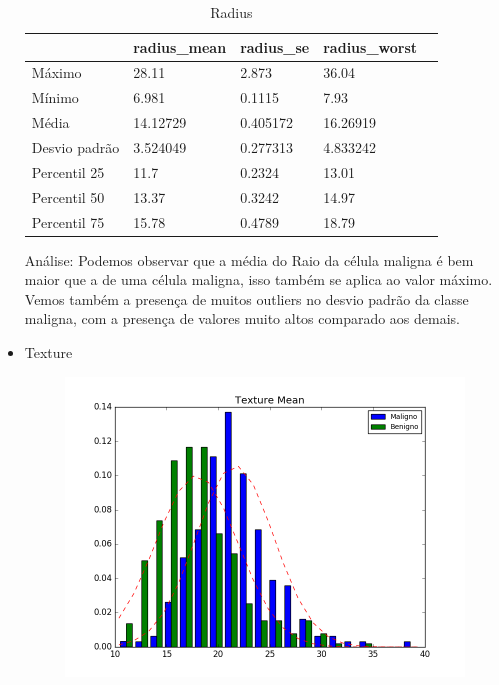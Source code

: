 \documentclass[11pt,a4paper]{article}
\numberwithin{equation}{section}
\begin{document}
\begin{itemize}
\begin{table}[H]
\centering
\caption{Radius}
\label{my-label}
\begin{tabular}{lllll}
\hline
              & radius\_mean & radius\_se & radius\_worst &  \\
\hline
Máximo        & 28.11        & 2.873      & 36.04         &  \\
Mínimo        & 6.981        & 0.1115     & 7.93          &  \\
Média         & 14.12729     & 0.405172   & 16.26919      &  \\
Desvio padrão & 3.524049     & 0.277313   & 4.833242      &  \\
Percentil 25  & 11.7         & 0.2324     & 13.01         &  \\
Percentil 50  & 13.37        & 0.3242     & 14.97         &  \\
Percentil 75  & 15.78        & 0.4789     & 18.79         &  \\
\hline
\end{tabular}
\end{table}


Análise: Podemos observar que a média do Raio da célula maligna é bem maior que a de uma célula maligna, isso também se aplica ao valor máximo. Vemos também a presença de muitos outliers no desvio padrão da classe maligna, com a presença de valores muito altos comparado aos demais.

\item Texture
\begin{figure}[H]
\centering
  \includegraphics[width=.5\linewidth]{../img/hist/texture_mean}
  \label{fig:test1}
\end{figure}%


\end{itemize}
\end{document}
